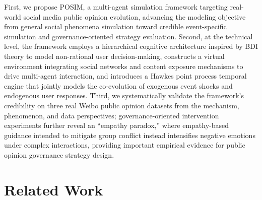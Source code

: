 \documentclass[a4paper,fleqn]{cas-dc}
\begin{document}
First, we propose POSIM, a multi-agent simulation framework targeting real-world social media public opinion evolution, advancing the modeling objective from general social phenomena simulation toward credible event-specific simulation and governance-oriented strategy evaluation. Second, at the technical level, the framework employs a hierarchical cognitive architecture inspired by BDI theory to model non-rational user decision-making, constructs a virtual environment integrating social networks and content exposure mechanisms to drive multi-agent interaction, and introduces a Hawkes point process temporal engine that jointly models the co-evolution of exogenous event shocks and endogenous user responses. Third, we systematically validate the framework's credibility on three real Weibo public opinion datasets from the mechanism, phenomenon, and data perspectives; governance-oriented intervention experiments further reveal an ``empathy paradox,'' where empathy-based guidance intended to mitigate group conflict instead intensifies negative emotions under complex interactions, providing important empirical evidence for public opinion governance strategy design.

\section{Related Work}\label{sec:related}
\end{document}
